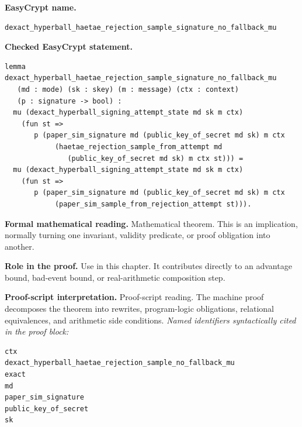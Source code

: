 \begin{formaltheorem}
\noindent\textbf{EasyCrypt name.}
\begin{lstlisting}[language=EasyCrypt,basicstyle=\ttfamily\scriptsize]
dexact_hyperball_haetae_rejection_sample_signature_no_fallback_mu
\end{lstlisting}
\noindent\textbf{Checked EasyCrypt statement.}
\begin{lstlisting}[language=EasyCrypt,basicstyle=\ttfamily\scriptsize]
lemma dexact_hyperball_haetae_rejection_sample_signature_no_fallback_mu
   (md : mode) (sk : skey) (m : message) (ctx : context)
   (p : signature -> bool) :
  mu (dexact_hyperball_signing_attempt_state md sk m ctx)
    (fun st =>
       p (paper_sim_signature md (public_key_of_secret md sk) m ctx
            (haetae_rejection_sample_from_attempt md
               (public_key_of_secret md sk) m ctx st))) =
  mu (dexact_hyperball_signing_attempt_state md sk m ctx)
    (fun st =>
       p (paper_sim_signature md (public_key_of_secret md sk) m ctx
            (paper_sim_sample_from_rejection_attempt st))).
\end{lstlisting}
\noindent\textbf{Formal mathematical reading.}
Mathematical theorem. This is an implication, normally turning one invariant, validity predicate, or proof obligation into another.

\noindent\textbf{Role in the proof.}
Use in this chapter. It contributes directly to an advantage bound, bad-event bound, or real-arithmetic composition step.

\noindent\textbf{Proof-script interpretation.}
Proof-script reading. The machine proof decomposes the theorem into rewrites, program-logic obligations, relational equivalences, and arithmetic side conditions.
\emph{Named identifiers syntactically cited in the proof block:}
\begin{lstlisting}[language=EasyCrypt,basicstyle=\ttfamily\scriptsize]
ctx
dexact_hyperball_haetae_rejection_sample_no_fallback_mu
exact
md
paper_sim_signature
public_key_of_secret
sk
\end{lstlisting}

\end{formaltheorem}

